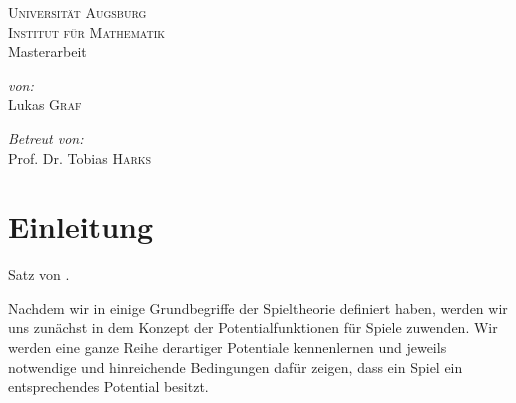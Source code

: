 \documentclass[a4paper,ngerman,11pt,bibliography=totoc]{scrartcl}
\theoremstyle{definition}
\theoremstyle{plain}
\theoremstyle{remark}
\begin{document}
	
	
	

\author{Lukas Graf}
\date{Letzte Aktualisierung: \today}

\thispagestyle{empty}


\begin{titlepage}\center
	\textsc{\LARGE Universität Augsburg}\\[1cm]
	
	\textsc{\Large Institut für Mathematik}\\[1.5cm]
	
	{\Large Masterarbeit \\[1cm]}
	{\huge {}}

	\vfill
	
	\begin{minipage}{0.4\textwidth}
		\begin{flushleft} \large
			\emph{von:}\\
			Lukas \textsc{Graf}
		\end{flushleft}
	\end{minipage}
	\begin{minipage}{0.4\textwidth}
		\begin{flushright} \large
			\emph{Betreut von:} \\
			Prof. Dr. Tobias \textsc{Harks}
		\end{flushright}
	\end{minipage}
	
\end{titlepage}


\tableofcontents

\listoftodos

\newpage
{}
{}
\section*{Einleitung}


Satz von \citeauthor{MonShap}.


Nachdem wir in  einige Grundbegriffe der Spieltheorie definiert haben, werden wir uns zunächst in  dem Konzept der Potentialfunktionen für Spiele zuwenden. Wir werden eine ganze Reihe derartiger Potentiale kennenlernen und jeweils notwendige und hinreichende Bedingungen dafür zeigen, dass ein Spiel ein entsprechendes Potential besitzt.
\end{document}
